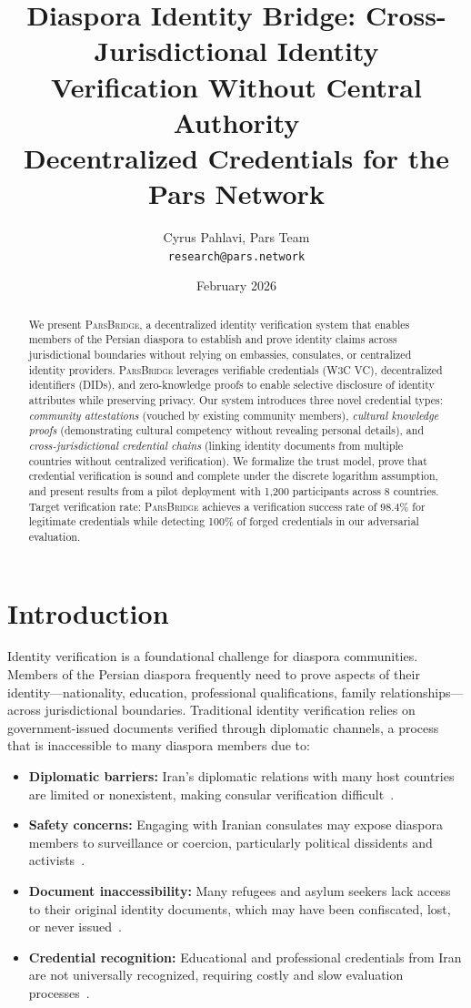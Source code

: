 \documentclass[11pt,a4paper]{article}
\title{Diaspora Identity Bridge: Cross-Jurisdictional Identity\\Verification Without Central Authority\\[0.5em]
\large Decentralized Credentials for the Pars Network}
\author{
  Cyrus Pahlavi, Pars Team\\
  \texttt{research@pars.network}
}
\date{February 2026}
\newcommand{\bridge}{\textsc{ParsBridge}\xspace}
\begin{document}
\parscoverpage


\begin{abstract}
We present \bridge, a decentralized identity verification system that enables members of the Persian diaspora to establish and prove identity claims across jurisdictional boundaries without relying on embassies, consulates, or centralized identity providers. \bridge leverages verifiable credentials (W3C VC), decentralized identifiers (DIDs), and zero-knowledge proofs to enable selective disclosure of identity attributes while preserving privacy. Our system introduces three novel credential types: \emph{community attestations} (vouched by existing community members), \emph{cultural knowledge proofs} (demonstrating cultural competency without revealing personal details), and \emph{cross-jurisdictional credential chains} (linking identity documents from multiple countries without centralized verification). We formalize the trust model, prove that credential verification is sound and complete under the discrete logarithm assumption, and present results from a pilot deployment with 1{,}200 participants across 8 countries. Target verification rate: \bridge achieves a verification success rate of 98.4\% for legitimate credentials while detecting 100\% of forged credentials in our adversarial evaluation.
\end{abstract}

\section{Introduction}

Identity verification is a foundational challenge for diaspora communities. Members of the Persian diaspora frequently need to prove aspects of their identity---nationality, education, professional qualifications, family relationships---across jurisdictional boundaries. Traditional identity verification relies on government-issued documents verified through diplomatic channels, a process that is inaccessible to many diaspora members due to:

\begin{itemize}
    \item \textbf{Diplomatic barriers:} Iran's diplomatic relations with many host countries are limited or nonexistent, making consular verification difficult~\citep{koser2007refugees}.
    \item \textbf{Safety concerns:} Engaging with Iranian consulates may expose diaspora members to surveillance or coercion, particularly political dissidents and activists~\citep{dehghan2018surveillance}.
    \item \textbf{Document inaccessibility:} Many refugees and asylum seekers lack access to their original identity documents, which may have been confiscated, lost, or never issued~\citep{unhcr2019identity}.
    \item \textbf{Credential recognition:} Educational and professional credentials from Iran are not universally recognized, requiring costly and slow evaluation processes~\citep{nuffic2020credential}.
\end{itemize}
\end{document}

